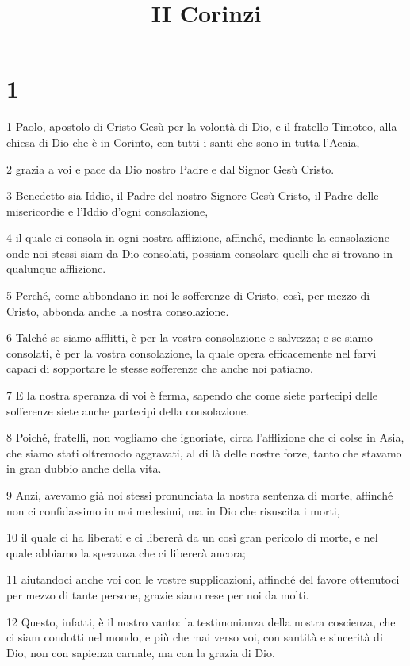 

\title{II Corinzi}


\chapter{1}

\par 1 Paolo, apostolo di Cristo Gesù per la volontà di Dio, e il fratello Timoteo, alla chiesa di Dio che è in Corinto, con tutti i santi che sono in tutta l'Acaia,
\par 2 grazia a voi e pace da Dio nostro Padre e dal Signor Gesù Cristo.
\par 3 Benedetto sia Iddio, il Padre del nostro Signore Gesù Cristo, il Padre delle misericordie e l'Iddio d'ogni consolazione,
\par 4 il quale ci consola in ogni nostra afflizione, affinché, mediante la consolazione onde noi stessi siam da Dio consolati, possiam consolare quelli che si trovano in qualunque afflizione.
\par 5 Perché, come abbondano in noi le sofferenze di Cristo, così, per mezzo di Cristo, abbonda anche la nostra consolazione.
\par 6 Talché se siamo afflitti, è per la vostra consolazione e salvezza; e se siamo consolati, è per la vostra consolazione, la quale opera efficacemente nel farvi capaci di sopportare le stesse sofferenze che anche noi patiamo.
\par 7 E la nostra speranza di voi è ferma, sapendo che come siete partecipi delle sofferenze siete anche partecipi della consolazione.
\par 8 Poiché, fratelli, non vogliamo che ignoriate, circa l'afflizione che ci colse in Asia, che siamo stati oltremodo aggravati, al di là delle nostre forze, tanto che stavamo in gran dubbio anche della vita.
\par 9 Anzi, avevamo già noi stessi pronunciata la nostra sentenza di morte, affinché non ci confidassimo in noi medesimi, ma in Dio che risuscita i morti,
\par 10 il quale ci ha liberati e ci libererà da un così gran pericolo di morte, e nel quale abbiamo la speranza che ci libererà ancora;
\par 11 aiutandoci anche voi con le vostre supplicazioni, affinché del favore ottenutoci per mezzo di tante persone, grazie siano rese per noi da molti.
\par 12 Questo, infatti, è il nostro vanto: la testimonianza della nostra coscienza, che ci siam condotti nel mondo, e più che mai verso voi, con santità e sincerità di Dio, non con sapienza carnale, ma con la grazia di Dio.
